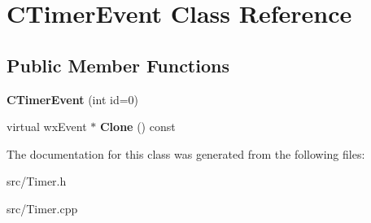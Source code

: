\section{CTimerEvent Class Reference}
\label{classCTimerEvent}
\subsection*{Public Member Functions}
\begin{DoxyCompactItemize}
\item 
{\bfseries CTimerEvent} (int id=0)\label{classCTimerEvent_a5790973c12341fcc90f45e6ff67f72de}

\item 
virtual wxEvent $\ast$ {\bfseries Clone} () const \label{classCTimerEvent_abe42cc86a0b8de6724b351917bd3aac6}

\end{DoxyCompactItemize}


The documentation for this class was generated from the following files:\begin{DoxyCompactItemize}
\item 
src/Timer.h\item 
src/Timer.cpp\end{DoxyCompactItemize}
